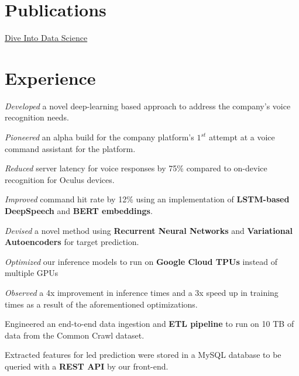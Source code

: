 \documentclass[]{deedy-resume-openfont}
\begin{document}
\begin{minipage}[t]{0.33\textwidth}
\section{Publications}
\href{https://eldridgejm.github.io/dive_into_data_science/front.html}{Dive Into Data Science}

%
%

\end{minipage}
\hfill
\begin{minipage}[t]{0.66\textwidth}


\section{Experience}
\vspace{\topsep} %
\begin{tightemize}
\item \emph{Developed} a novel deep-learning based approach to address the company's voice recognition needs.
\item \emph{Pioneered} an alpha build for the company platform's $1^{st}$ attempt at a voice command assistant for the platform.
\item \emph{Reduced} server latency for voice responses by 75\% compared to on-device recognition for Oculus devices.
\item \emph{Improved} command hit rate by 12\% using an implementation of \textbf{LSTM-based DeepSpeech} and \textbf{BERT embeddings}.
\end{tightemize}
\sectionsep

\begin{tightemize}
\item \emph{Devised} a novel method using \textbf{Recurrent Neural Networks} and \textbf{Variational Autoencoders} for target prediction.
\item \emph{Optimized} our inference models to run on \textbf{Google Cloud TPUs} instead of multiple GPUs
\item \emph{Observed} a 4x improvement in inference times and a 3x speed up in training times as a result of the aforementioned optimizations.
\item {Engineered} an end-to-end data ingestion and \textbf{ETL pipeline} to
    run on 10 TB of data from the Common Crawl dataset.
\item Extracted features for led prediction were stored in a MySQL database to be queried with a \textbf{REST API} by our front-end.
\end{tightemize}
\sectionsep


\end{minipage}
\end{document}
